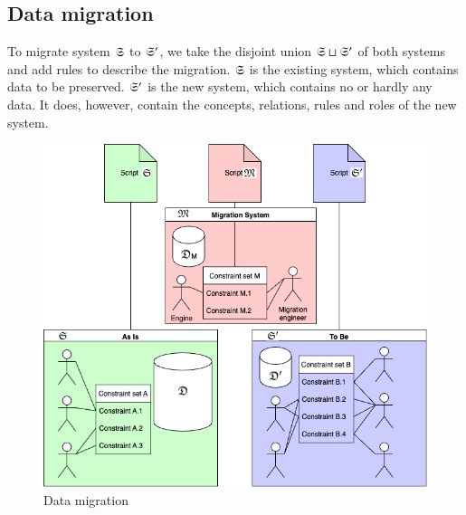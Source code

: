 \documentclass{elsarticle}
\begin{document}
\subsection{Data migration}
   To migrate system $\mathfrak{S}$ to $\mathfrak{S}'$, we take the disjoint union $\mathfrak{S}\sqcup\mathfrak{S}'$ of both systems
   and add rules to describe the migration.
   $\mathfrak{S}$ is the existing system, which contains data to be preserved.
   $\mathfrak{S}'$ is the new system, which contains no or hardly any data.
   It does, however, contain the concepts, relations, rules and roles of the new system.
\begin{figure}[bht]
   \begin{center}
     \includegraphics[scale=.45]{Migration.png}
   \end{center}
\caption{Data migration}
\label{fig:event flow}
\end{figure}
      
\end{document}
